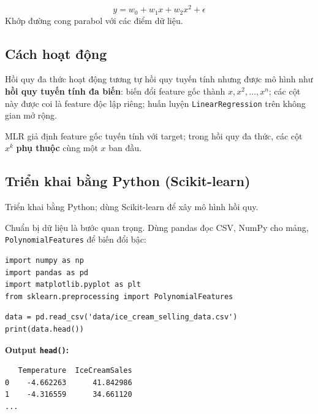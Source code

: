 \begin{dinhnghia}[title={Đa thức bậc 2 (parabol)}]
\[
y = w_0 + w_1 x + w_2 x^2 + \epsilon
\]
Khớp đường cong parabol với các điểm dữ liệu.
\end{dinhnghia}

\subsection{Cách hoạt động}

\begin{phuongphap}[title={Cơ chế trong học máy}]
Hồi quy đa thức hoạt động tương tự hồi quy tuyến tính nhưng được mô hình như \textbf{hồi quy tuyến tính đa biến}:
biến đổi feature gốc thành $x, x^2, \ldots, x^n$; các cột này được coi là feature độc lập riêng; huấn luyện \texttt{LinearRegression} trên không gian mở rộng.
\end{phuongphap}

\begin{luuy}[title={Khác MLR thuần}]
MLR giả định feature gốc tuyến tính với target; trong hồi quy đa thức, các cột $x^k$ \textbf{phụ thuộc} cùng một $x$ ban đầu.
\end{luuy}

\subsection{Triển khai bằng Python (Scikit-learn)}

\begin{phuongphap}[title={Thư viện}]
Triển khai bằng Python; dùng Scikit-learn để xây mô hình hồi quy.
\end{phuongphap}

\begin{vidu}[title={Bước 1: Chuẩn bị dữ liệu --- import}]
Chuẩn bị dữ liệu là bước quan trọng. Dùng pandas đọc CSV, NumPy cho mảng, \texttt{PolynomialFeatures} để biến đổi bậc:

\begin{lstlisting}
import numpy as np
import pandas as pd
import matplotlib.pyplot as plt
from sklearn.preprocessing import PolynomialFeatures
\end{lstlisting}
\end{vidu}

\begin{vidu}[title={Nạp dataset}]
\begin{lstlisting}
data = pd.read_csv('data/ice_cream_selling_data.csv')
print(data.head())
\end{lstlisting}

\textbf{Output \texttt{head()}:}
\begin{verbatim}
   Temperature  IceCreamSales
0    -4.662263      41.842986
1    -4.316559      34.661120
...
\end{verbatim}
\end{vidu}

